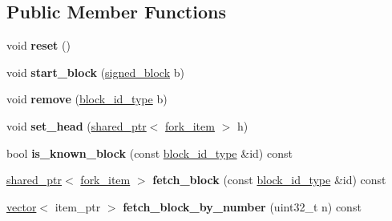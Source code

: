 \subsection*{Public Member Functions}
\begin{DoxyCompactItemize}
\item 
\mbox{\label{classaacio_1_1chain_1_1fork__database_a7cde14232318157659c8831a63b63022}} 
void {\bfseries reset} ()
\item 
\mbox{\label{classaacio_1_1chain_1_1fork__database_aa43590dd9d20201f55870c0b281408b9}} 
void {\bfseries start\+\_\+block} (\mbox{\hyperlink{structaacio_1_1chain_1_1signed__block}{signed\+\_\+block}} b)
\item 
\mbox{\label{classaacio_1_1chain_1_1fork__database_af2d82f6b87b38ca0b6f639b2fd54ae08}} 
void {\bfseries remove} (\mbox{\hyperlink{classfc_1_1sha256}{block\+\_\+id\+\_\+type}} b)
\item 
\mbox{\label{classaacio_1_1chain_1_1fork__database_a7512b29bd36e7e495ad80dce33fc5fb2}} 
void {\bfseries set\+\_\+head} (\mbox{\hyperlink{classfc_1_1shared__ptr}{shared\+\_\+ptr}}$<$ \mbox{\hyperlink{structaacio_1_1chain_1_1fork__item}{fork\+\_\+item}} $>$ h)
\item 
\mbox{\label{classaacio_1_1chain_1_1fork__database_a4e6f74761a844273b454cb907b575886}} 
bool {\bfseries is\+\_\+known\+\_\+block} (const \mbox{\hyperlink{classfc_1_1sha256}{block\+\_\+id\+\_\+type}} \&id) const
\item 
\mbox{\label{classaacio_1_1chain_1_1fork__database_ab58a4becabf2daed75c4a4665ed3d2ba}} 
\mbox{\hyperlink{classfc_1_1shared__ptr}{shared\+\_\+ptr}}$<$ \mbox{\hyperlink{structaacio_1_1chain_1_1fork__item}{fork\+\_\+item}} $>$ {\bfseries fetch\+\_\+block} (const \mbox{\hyperlink{classfc_1_1sha256}{block\+\_\+id\+\_\+type}} \&id) const
\item 
\mbox{\label{classaacio_1_1chain_1_1fork__database_a1d7ea264c55ff532f48906fe6b7ddf5b}} 
\mbox{\hyperlink{classstd_1_1vector}{vector}}$<$ item\+\_\+ptr $>$ {\bfseries fetch\+\_\+block\+\_\+by\+\_\+number} (uint32\+\_\+t n) const

\end{DoxyCompactItemize}
